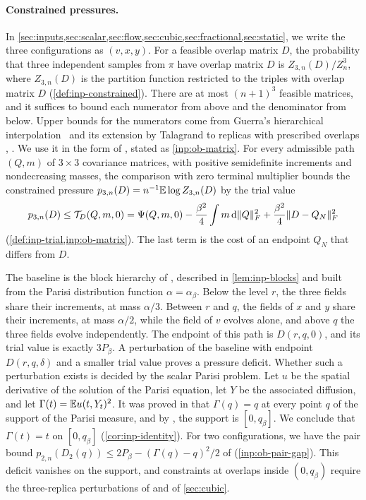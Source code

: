 \paragraph{Constrained pressures.} In
\cref{sec:inputs,sec:scalar,sec:flow,sec:cubic,sec:fractional,sec:static}, we
write the three configurations as $(v,x,y)$. For a feasible overlap matrix
$D$, the probability that three independent samples from $\pi$ have overlap
matrix $D$ is $Z_{3,n}(D)/Z_n^3$, where $Z_{3,n}(D)$ is the partition function
restricted to the triples with overlap matrix $D$ (\cref{def:inp-constrained}).
There are at most $(n+1)^3$ feasible matrices, and it suffices to bound each
numerator from above and the denominator from below. Upper bounds for the
numerators come from Guerra's hierarchical interpolation~\cite{guerra-2003}
and its extension by Talagrand to replicas with prescribed overlaps
\cite[Section~3]{parisi-formula}, \cite[Propositions~3.4 and~4.4]{talagrand-2007}.
We use it in the form of \cite[Proposition~2.3]{oai-barriers}, stated as
\cref{inp:ob-matrix}. For every admissible path $(Q,m)$ of $3\times3$
covariance matrices, with positive semidefinite increments and nondecreasing
masses, the comparison with zero terminal multiplier bounds the constrained
pressure $p_{3,n}(D)=n^{-1}\mathbb E\log Z_{3,n}(D)$ by the trial value
\[
 p_{3,n}(D)\le\mathcal T_D(Q,m,0)
 =\Psi(Q,m,0)-\frac{\beta^2}{4}\int m\,\mathrm d\lVert Q\rVert_F^2
   +\frac{\beta^2}{4}\lVert D-Q_N\rVert_F^2
\]
(\cref{def:inp-trial,inp:ob-matrix}). The last term is the cost of an endpoint
$Q_N$ that differs from $D$.

The baseline is the block hierarchy of
\cite[Section~4.2 and Section~7, Step~1]{oai-barriers}, described in
\cref{lem:inp-blocks} and built from the Parisi
distribution function $\alpha=\alpha_\beta$. Below the level $r$, the three
fields share their increments, at mass $\alpha/3$. Between $r$ and $q$, the
fields of $x$ and $y$ share their increments, at mass $\alpha/2$, while the
field of $v$ evolves alone, and above $q$ the three fields evolve
independently. The endpoint of this path is $D(r,q,0)$, and its trial value is
exactly $3P_\beta$. A perturbation of the baseline with endpoint
$D(r,q,\delta)$ and a smaller trial value proves a pressure deficit. Whether
such a perturbation exists is decided by the scalar Parisi problem. Let $u$ be
the spatial derivative of the solution of the Parisi equation, let $Y$ be the
associated diffusion, and let $\Gamma(t)=\mathbb E u(t,Y_t)^2$. It was proved in
\cite[Proposition~3.2]{oai-barriers} that $\Gamma(q)=q$ at every point $q$ of
the support of the Parisi measure, and by
\cite[Theorem~1.1]{full-rsb}, the support is $[0,q_\beta]$. We conclude that
$\Gamma(t)=t$ on $[0,q_\beta]$ (\cref{cor:inp-identity}). For two
configurations, we have the pair bound
$p_{2,n}(D_2(q))\le2P_\beta-(\Gamma(q)-q)^2/2$ of
\cite[Lemma~4.3]{oai-barriers} (\cref{inp:ob-pair-gap}). This deficit
vanishes on the support, and
constraints at overlaps inside $(0,q_\beta)$ require the three-replica
perturbations of \cite[Sections~4 and~7]{oai-barriers} and of
\cref{sec:cubic}.

